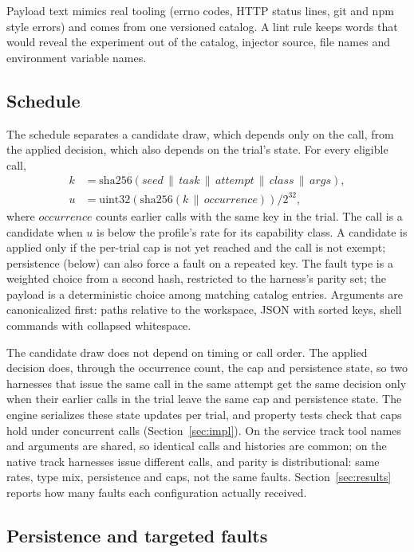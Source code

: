 Payload text mimics real tooling (errno codes, HTTP status lines, git and npm style errors) and comes from one versioned catalog.
A lint rule keeps words that would reveal the experiment out of the catalog, injector source, file names and environment variable names.

\subsection{Schedule}

The schedule separates a candidate draw, which depends only on the call, from the applied decision, which also depends on the trial's state.
For every eligible call,
\begin{align*}
k &= \mathrm{sha256}(\mathit{seed} \,\|\, \mathit{task} \,\|\, \mathit{attempt} \,\|\, \mathit{class} \,\|\, \mathit{args}),\\
u &= \mathrm{uint32}(\mathrm{sha256}(k \,\|\, \mathit{occurrence})) / 2^{32},
\end{align*}
where $\mathit{occurrence}$ counts earlier calls with the same key in the trial.
The call is a candidate when $u$ is below the profile's rate for its capability class.
A candidate is applied only if the per-trial cap is not yet reached and the call is not exempt; persistence (below) can also force a fault on a repeated key.
The fault type is a weighted choice from a second hash, restricted to the harness's parity set; the payload is a deterministic choice among matching catalog entries.
Arguments are canonicalized first: paths relative to the workspace, JSON with sorted keys, shell commands with collapsed whitespace.

The candidate draw does not depend on timing or call order.
The applied decision does, through the occurrence count, the cap and persistence state, so two harnesses that issue the same call in the same attempt get the same decision only when their earlier calls in the trial leave the same cap and persistence state.
The engine serializes these state updates per trial, and property tests check that caps hold under concurrent calls (Section~\ref{sec:impl}).
On the service track tool names and arguments are shared, so identical calls and histories are common; on the native track harnesses issue different calls, and parity is distributional: same rates, type mix, persistence and caps, not the same faults.
Section~\ref{sec:results} reports how many faults each configuration actually received.

\subsection{Persistence and targeted faults}

